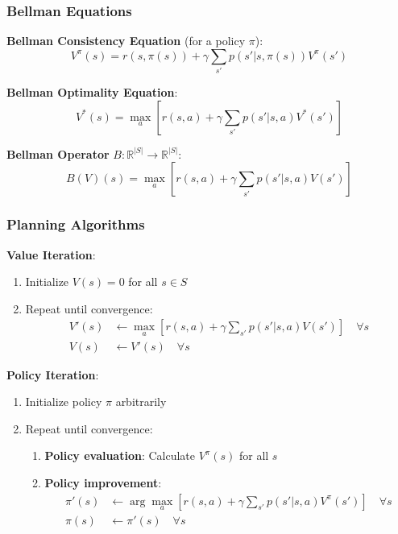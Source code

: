 \documentclass{article}
\begin{document}
\subsubsection{Bellman Equations}
\textbf{Bellman Consistency Equation} (for a policy $\pi$):
\begin{equation}
    V^\pi(s) = r(s, \pi(s)) + \gamma \sum_{s'} p(s'|s,\pi(s)) V^\pi(s')
\end{equation}

\textbf{Bellman Optimality Equation}:
\begin{equation}
    V^*(s) = \max_a \left[r(s,a) + \gamma \sum_{s'} p(s'|s,a) V^*(s')\right]
\end{equation}

\textbf{Bellman Operator} $B: \mathbb{R}^{|S|} \rightarrow \mathbb{R}^{|S|}$:
\begin{equation}
    B(V)(s) = \max_a \left[r(s,a) + \gamma \sum_{s'} p(s'|s,a) V(s')\right]
\end{equation}

\subsubsection{Planning Algorithms}

\textbf{Value Iteration}:
\begin{enumerate}
    \item Initialize $V(s) = 0$ for all $s \in S$
    \item Repeat until convergence:
    \begin{align}
        V'(s) &\leftarrow \max_a \left[r(s,a) + \gamma \sum_{s'} p(s'|s,a) V(s')\right] \quad \forall s \\
        V(s) &\leftarrow V'(s) \quad \forall s
    \end{align}
\end{enumerate}

\textbf{Policy Iteration}:
\begin{enumerate}
    \item Initialize policy $\pi$ arbitrarily
    \item Repeat until convergence:
    \begin{enumerate}
        \item \textbf{Policy evaluation}: Calculate $V^\pi(s)$ for all $s$
        \item \textbf{Policy improvement}:
        \begin{align}
            \pi'(s) &\leftarrow \arg\max_a \left[r(s,a) + \gamma \sum_{s'} p(s'|s,a) V^\pi(s')\right] \quad \forall s \\
            \pi(s) &\leftarrow \pi'(s) \quad \forall s
        \end{align}
    \end{enumerate}
\end{enumerate}
\end{document}
